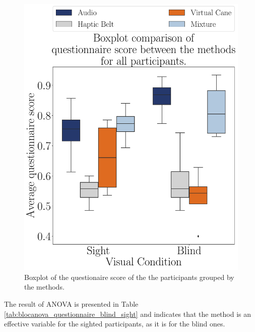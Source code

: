 \begin{figure}[!htb]
    \centering
    \includegraphics[width = 0.75\linewidth]{Resultados/Questionario/Figuras/pdf/boxplot_questionnaire_scene.pdf}
    \caption{Boxplot of the questionaire score of the the participants grouped by the methods.}
    \label{fig:boxplot_questionnaire_scene}
\end{figure}

%
%
%

The result of ANOVA is presented in Table \ref{tab:blocanova_questionnaire_blind_sight} and indicates that the method is an effective variable for the sighted participants, as it is for the blind ones.

